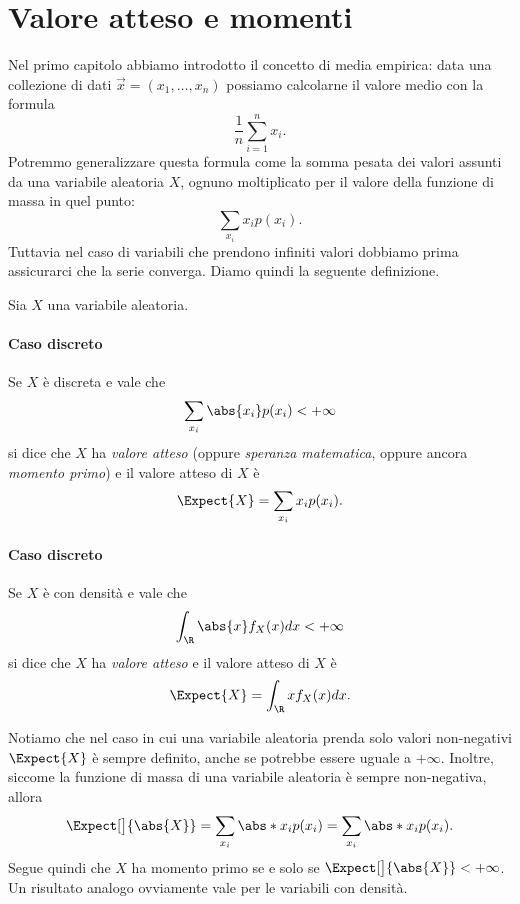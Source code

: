 \section{Valore atteso e momenti}

Nel primo capitolo abbiamo introdotto il concetto di media empirica: data una collezione di dati $\vec x = (x_1, \dots, x_n)$ possiamo calcolarne il valore medio con la formula \[
    \frac1n \sum_{i = 1}^n x_i. 
\] Potremmo generalizzare questa formula come la somma pesata dei valori assunti da una variabile aleatoria $X$, ognuno moltiplicato per il valore della funzione di massa in quel punto: \[
    \sum_{x_i} x_i p(x_i). 
\] Tuttavia nel caso di variabili che prendono infiniti valori dobbiamo prima assicurarci che la serie converga. Diamo quindi la seguente definizione.

\begin{definition}
     Sia $X$ una variabile aleatoria.
    \paragraph{Caso discreto} Se $X$ è discreta e vale che \[
        \sum_{x_i} \abs{x_i}p(x_i) < +\infty
    \] si dice che $X$ ha \emph{valore atteso} (oppure \emph{speranza matematica}, oppure ancora \emph{momento primo}) e il valore atteso di $X$ è \[
        \Expect{X} = \sum_{x_i} x_ip(x_i).    
    \]
    \paragraph{Caso discreto} Se $X$ è con densità e vale che \[
        \int_\R \abs{x}f_X(x)dx < +\infty
    \] si dice che $X$ ha \emph{valore atteso} e il valore atteso di $X$ è \[
        \Expect{X} = \int_\R xf_X(x)dx.    
    \]
\end{definition}

\begin{remark}
    Notiamo che nel caso in cui una variabile aleatoria prenda solo valori non-negativi $\Expect{X}$ è sempre definito, anche se potrebbe essere uguale a $+\infty$.
    Inoltre, siccome la funzione di massa di una variabile aleatoria è sempre non-negativa, allora \[
        \Expect[\big]{\abs{X}} = \sum_{x_i} \abs*{x_ip(x_i)} = \sum_{x_i} \abs*{x_i}p(x_i).   
    \] Segue quindi che $X$ ha momento primo se e solo se $\Expect[\big]{\abs{X}} < +\infty$. Un risultato analogo ovviamente vale per le variabili con densità.
\end{remark}

